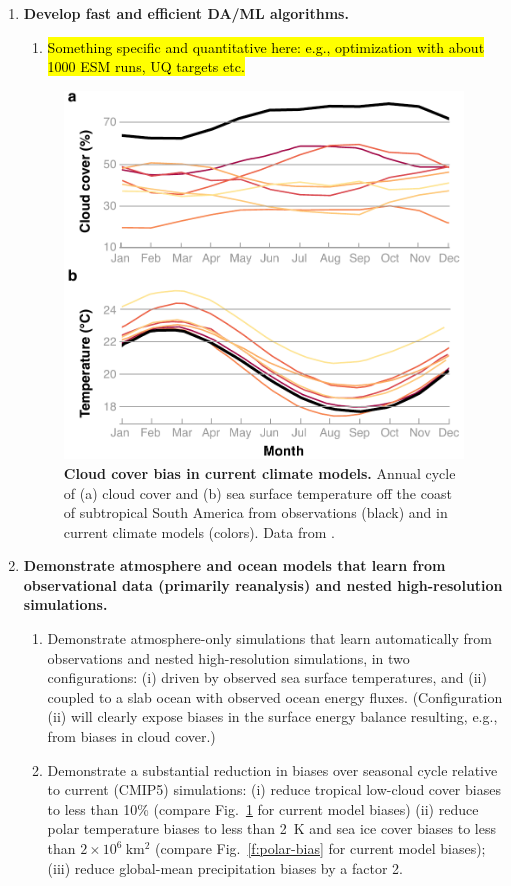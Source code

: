 \documentclass{article}
\begin{document}
\begin{enumerate}
\begin{enumerate}
    \end{enumerate}
    
    \item \textbf{Develop fast and efficient DA/ML algorithms.}
     \begin{enumerate}
        \item \hl{Something specific and quantitative here: e.g., optimization with about 1000 ESM runs, UQ targets etc.}
    \end{enumerate}
    
    \begin{figure}[htb]
     \centerline{\includegraphics[width=.6\textwidth]{Lin-Sc-bias.pdf}}
      \caption{\textbf{Cloud cover bias in current climate models.} Annual cycle of (a) cloud cover and (b) sea surface temperature off the coast of subtropical South America from observations (black) and in current climate models (colors). Data from \protect\citet{Lin14b}.}\label{f:Sc-bias}
    \end{figure}
    \item \textbf{Demonstrate atmosphere and ocean models that learn from observational data (primarily reanalysis) and nested high-resolution simulations.}
    \begin{enumerate}
        \item Demonstrate atmosphere-only simulations that learn automatically from observations and nested high-resolution simulations, in two configurations: (i) driven by observed sea surface temperatures, and (ii) coupled to a slab ocean with observed ocean energy fluxes. (Configuration (ii) will clearly expose biases in the surface energy balance resulting, e.g., from biases in cloud cover.)
        \item Demonstrate a substantial reduction in biases over seasonal cycle relative to current (CMIP5) simulations: (i) reduce tropical low-cloud cover biases to less than 10\% (compare Fig.~\ref{f:Sc-bias} for current model biases) (ii) reduce polar temperature biases to less than 2~K and sea ice cover biases to less than $2\times 10^6~\mathrm{km^2}$ (compare Fig.~\ref{f:polar-bias} for current model biases); (iii) reduce global-mean precipitation biases by a factor 2.

\end{enumerate}
\end{enumerate}
\end{document}
